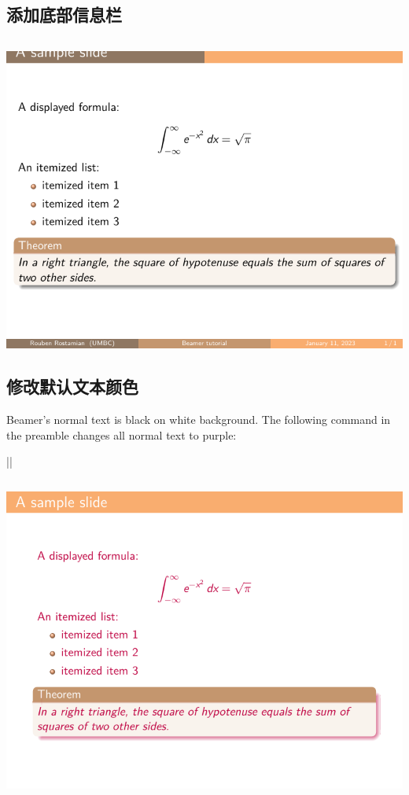 \begin{column}{0.5\textwidth}
\subsection{添加底部信息栏}

\inputminted[linenos=true]{latex}{examples/beamer/theme-footer.tex}

\includegraphics{examples/beamer/theme-footer.pdf}

\subsection{修改默认文本颜色}

Beamer’s normal text is black on white background. The following command in the preamble changes all normal text to purple:

||

\inputminted[linenos=true]{latex}{examples/beamer/theme-text-color.tex}

\includegraphics{examples/beamer/theme-text-color.pdf}


\end{column}

